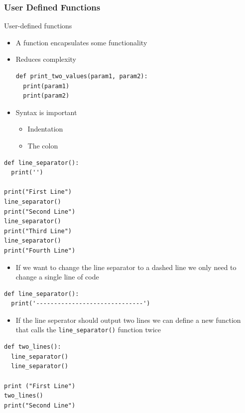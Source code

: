 \documentclass[10pt, a4paper]{beamer} %
\begin{document}
\begin{frame}\frametitle{User Defined Functions}
\begin{block}{User-defined functions}
  \begin{itemize}
    \item A function encapsulates some functionality
    \item Reduces complexity
    \begin{lstlisting}
def print_two_values(param1, param2):
  print(param1)
  print(param2)
    \end{lstlisting}
    \item Syntax is important
    \begin{itemize}
      \item Indentation
      \item The colon
    \end{itemize}
  \end{itemize}
\end{block}
\framebreak
\begin{examples}
  \begin{lstlisting}
def line_separator():
  print('')

print("First Line")
line_separator()
print("Second Line")
line_separator()
print("Third Line")
line_separator()
print("Fourth Line")
\end{lstlisting}
\end{examples}
\begin{itemize}
  \item If we want to change the line separator to a dashed line we only need to change a single line of code
\end{itemize}
\begin{lstlisting}
def line_separator():
  print('------------------------------')
\end{lstlisting}


\framebreak

\begin{examples}
  \begin{itemize}
    \item If the line seperator should output two lines we can define a new function that calls the \lstinline!line_separator()! function twice
  \end{itemize}
  \begin{lstlisting}
def two_lines():
  line_separator()
  line_separator()

print ("First Line")
two_lines()
print("Second Line")
  \end{lstlisting}
\end{examples}


\end{frame}
\end{document}
